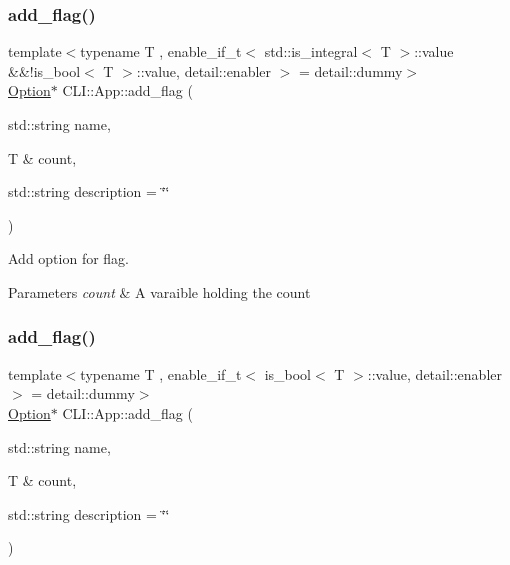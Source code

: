 \subsubsection{\texorpdfstring{add\+\_\+flag()}{add\_flag()}\hspace{0.1cm}{\footnotesize\ttfamily [1/2]}}
{\footnotesize\ttfamily template$<$typename T , enable\+\_\+if\+\_\+t$<$ std\+::is\+\_\+integral$<$ T $>$\+::value \&\&!is\+\_\+bool$<$ T $>$\+::value, detail\+::enabler $>$  = detail\+::dummy$>$ \\
\hyperlink{class_c_l_i_1_1_option}{Option}$\ast$ C\+L\+I\+::\+App\+::add\+\_\+flag (\begin{DoxyParamCaption}\item[{std\+::string}]{name,  }\item[{T \&}]{count,  }\item[{std\+::string}]{description = {\ttfamily \char`\"{}\char`\"{}} }\end{DoxyParamCaption})\hspace{0.3cm}{\ttfamily [inline]}}



Add option for flag. 


\begin{DoxyParams}{Parameters}
{\em count} & A varaible holding the count \\
\hline
\end{DoxyParams}
\mbox{\label{class_c_l_i_1_1_app_ad3608e288902be51227ce8549bac6743}} 
\subsubsection{\texorpdfstring{add\+\_\+flag()}{add\_flag()}\hspace{0.1cm}{\footnotesize\ttfamily [2/2]}}
{\footnotesize\ttfamily template$<$typename T , enable\+\_\+if\+\_\+t$<$ is\+\_\+bool$<$ T $>$\+::value, detail\+::enabler $>$  = detail\+::dummy$>$ \\
\hyperlink{class_c_l_i_1_1_option}{Option}$\ast$ C\+L\+I\+::\+App\+::add\+\_\+flag (\begin{DoxyParamCaption}\item[{std\+::string}]{name,  }\item[{T \&}]{count,  }\item[{std\+::string}]{description = {\ttfamily \char`\"{}\char`\"{}} }\end{DoxyParamCaption})\hspace{0.3cm}{\ttfamily [inline]}}



